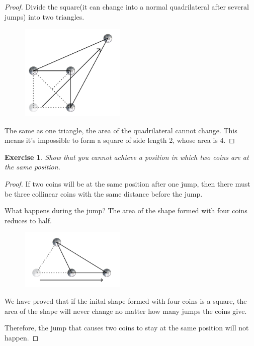 \documentclass[12pt,a4]{article}
\theoremstyle{exercise}
\newtheorem{exercise}[theorem]{Exercise}
\begin{document}
\begin{proof}
    Divide the square(it can change into a normal quadrilateral after several jumps) into two triangles.

    \begin{figure}[H]
        \small
        \centering
        \includegraphics[width=5cm]{fourcoins.png}
        \label{fig:fourCoins}
    \end{figure}

    The same as one triangle, the area of the quadrilateral cannot change.
    This means it's impossible to form a square of side length 2, whose area is 4.

\end{proof}

\begin{exercise}
    Show that you cannot achieve a position in which two coins are at the same position.
\end{exercise}

\begin{proof}
    If two coins will be at the same position after one jump, then there must be three collinear coins with the same distance before the jump.

    What happens during the jump? The area of the shape formed with four coins reduces to half.

    \begin{figure}[H]
        \small
        \centering
        \includegraphics[width=5cm]{coinssameposition.png}
        \label{fig:coinsSamePosition}
    \end{figure}

    We have proved that if the inital shape formed with four coins is a square, the area of the shape will never change no matter how many jumps the coins give.

    Therefore, the jump that causes two coins to stay at the same position will not happen.

\end{proof}
\end{document}
